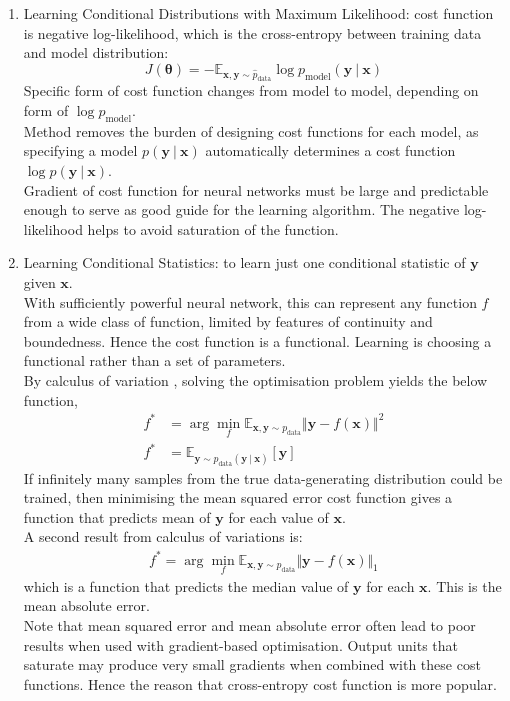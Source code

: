 \begin{definition} 
\begin{enumerate}[label=\roman*.]
\setlength{\itemsep}{0pt}
\item Learning Conditional Distributions with Maximum Likelihood: cost function is negative log-likelihood, which is the cross-entropy between training data and model distribution:
\begin{equation}
J(\bm{\theta}) = - \mathbb{E}_{\bm{x}, \bm{y} \sim \hat{p}_{\text{data}}} \log p_{\text{model}}(\bm{y} \ \vert \ \bm{x}) \nonumber
\end{equation}
Specific form of cost function changes from model to model, depending on form of $\log p_{\text{model}}$.\\
Method removes the burden of designing cost functions for each model, as specifying a model $p(\bm{y} \ \vert \ \bm{x})$ automatically determines a cost function $\log p(\bm{y} \ \vert \ \bm{x})$.\\
Gradient of cost function for neural networks must be large and predictable enough to serve as good guide for the learning algorithm. The negative log-likelihood helps to avoid saturation of the function.
\item Learning Conditional Statistics: to learn just one conditional statistic of $\bm{y}$ given $\bm{x}$.\\
With sufficiently powerful neural network, this can represent any function $f$ from a wide class of function, limited by features of continuity and boundedness. Hence the cost function is a functional. Learning is choosing a functional rather than a set of parameters.\\
By calculus of variation	, solving the optimisation problem yields the below function,
\begin{align}
f^* &= \arg \min_f \mathbb{E}_{\bm{x}, \bm{y} \sim p_{\text{data}}} \Vert \bm{y} - f(\bm{x}) \Vert^2 \nonumber \\
f^* &= \mathbb{E}_{\bm{y} \sim p_{\text{data}}(\bm{y} \ \vert \ \bm{x})} [\bm{y}] \nonumber
\end{align}
If infinitely many samples from the true data-generating distribution could be trained, then minimising the mean squared error cost function gives a function that predicts mean of $\bm{y}$ for each value of $\bm{x}$.\\
A second result from calculus of variations is:
\begin{align}
f^* = \arg \min_f \mathbb{E}_{\bm{x}, \bm{y} \sim p_{\text{data}}} \Vert \bm{y} - f(\bm{x}) \Vert_1 \nonumber
\end{align}
which is a function that predicts the median value of $\bm{y}$ for each $\bm{x}$. This is the mean absolute error.\\
Note that mean squared error and mean absolute error often lead to poor results when used with gradient-based optimisation. Output units that saturate may produce very small gradients when combined with these cost functions. Hence the reason that cross-entropy cost function is more popular.
\end{enumerate}
\end{definition}

